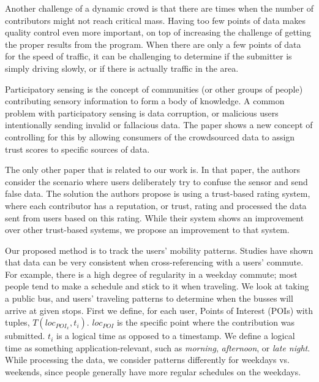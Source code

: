 \documentclass{sig-alternate-05-2015}
\begin{document}
\begin{itemize}
		Another challenge of a dynamic crowd is that there are times when the number of contributors might not reach critical mass. Having too few points of data makes quality control even more important, on top of increasing the challenge of getting the proper results from the program. When there are only a few points of data for the speed of traffic, it can be challenging to determine if the submitter is simply driving slowly, or if there is actually traffic in the area.
	\end{itemize}
	
	Participatory sensing is the concept of communities (or other groups of people) contributing sensory information to form a body of knowledge. \cite{wilsondefinition}
	A common problem with participatory sensing is data corruption, or malicious users intentionally sending invalid or fallacious data. The paper \cite{reddy2009mobisense} shows a new concept of controlling for this by allowing consumers of the crowdsourced data to assign trust scores to specific sources of data. 
	
	The only other paper that is related to our work is. \cite{huang2010you}
	In that paper, the authors consider the scenario where users deliberately try to confuse the sensor and send false data. The solution the authors propose is using a trust-based rating system, where each contributor has a reputation, or trust, rating and processed the data sent from users based on this rating. While their system shows an improvement over other trust-based systems, we propose an improvement to that system.
	
	Our proposed method is to track the users' mobility patterns. Studies have shown that data can be very consistent when cross-referencing with a users' commute. For example, there is a high degree of regularity in a weekday commute; most people tend to make a schedule and stick to it when traveling. \cite{rhee2011levy}
	We look at taking a public bus, and users' traveling patterns to determine when the busses will arrive at given stops. First we define, for each user, Points of Interest (POIs) with tuples, $T(loc_{POI_x}, t_i)$. $loc_{POI}$ is the specific point where the contribution was submitted. $t_i$ is a logical time as opposed to a timestamp. We define a logical time as something application-relevant, such as \emph{morning}, \emph{afternoon}, or \emph{late night}.
	While processing the data, we consider patterns differently for weekdays vs. weekends, since people generally have more regular schedules on the weekdays.
	
\end{document}
